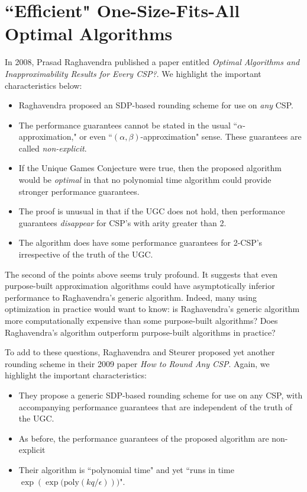 \documentclass[letterpaper, 12pt]{article}
\numberwithin{equation}{section}
\begin{document}
\section{``Efficient" One-Size-Fits-All Optimal Algorithms}
In 2008, Prasad Raghavendra published a paper entitled \textit{Optimal Algorithms and Inapproximability Results for Every CSP?}. We highlight the important characteristics below:

\begin{itemize}
\item Raghavendra proposed an SDP-based rounding scheme for use on \textit{any} CSP.
\item The performance guarantees cannot be stated in the usual ``$\alpha$-approximation," or even ``$(\alpha,\beta)$-approximation" sense.  These guarantees are called \textit{non-explicit}.
\item If the Unique Games Conjecture were true, then the proposed algorithm would be \textit{optimal} in that no polynomial time algorithm could provide stronger performance guarantees.
\item The proof is unusual in that if the UGC does not hold, then performance guarantees \textit{disappear} for CSP's with arity greater than 2.
\item The algorithm does have some performance guarantees for 2-CSP's irrespective of the truth of the UGC.
\end{itemize}

The second of the points above seems truly profound. It suggests that even purpose-built approximation algorithms could have asymptotically inferior performance to Raghavendra's generic algorithm. Indeed, many using optimization in practice would want to know: is Raghavendra's generic algorithm more computationally expensive than some purpose-built algorithms? Does Raghavendra's algorithm outperform purpose-built algorithms in practice? 

To add to these questions, Raghavendra and Steurer proposed yet another rounding scheme in their 2009 paper \textit{How to Round Any CSP}. Again, we highlight the important characteristics:

\begin{itemize}
\item They propose a generic SDP-based rounding scheme for use on any CSP, with accompanying performance guarantees that are independent of the truth of the UGC.
\item As before, the performance guarantees of the proposed algorithm are non-explicit
\item Their algorithm is ``polynomial time" and yet ``runs in time $\exp{(\exp{(\text{poly}(kq/\epsilon)}))}$".
\end{itemize}
\end{document}
